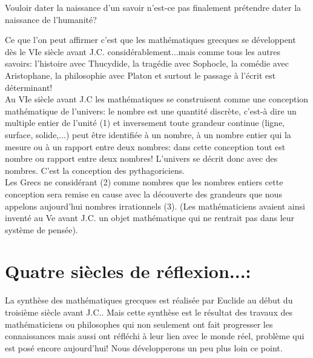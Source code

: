 \documentclass[a4paper, 12pt, twoside]{book}
\begin{document}
Vouloir dater la naissance d'un savoir n'est-ce pas finalement prétendre dater la naissance de l'humanité?\



     Ce que l'on peut affirmer c'est que les mathématiques grecques se développent dès le VIe siècle avant J.C. considérablement...mais comme tous les autres savoirs: l'histoire avec Thucydide, la tragédie avec Sophocle, la comédie avec Aristophane, la philosophie avec Platon et surtout le passage à l'écrit est déterminant!\\
     

      Au VIe siècle avant J.C les mathématiques se construisent comme une conception mathématique de l'univers: le nombre est une quantité discrète, c'est-à dire un multiple entier de l'unité (1) et inversement toute grandeur continue (ligne, surface, solide,...) peut être identifiée à un nombre, à un nombre entier qui la mesure ou à un rapport entre deux nombres: dans cette conception tout est nombre ou rapport entre deux nombres!  L'univers se décrit donc avec des nombres. C'est la conception des pythagoriciens.\\
      
       Les Grecs ne considérant (2) comme nombres que les nombres entiers cette conception sera remise en cause avec la découverte des grandeurs que nous appelons aujourd'hui nombres irrationnels (3). (Les mathématiciens avaient ainsi inventé au Ve avant J.C. un objet mathématique qui ne rentrait pas dans leur système de pensée).\
       
        \section{Quatre siècles de réflexion...:}
     
      
     
      La synthèse des mathématiques grecques est réalisée par Euclide au début du troisième siècle avant J.C.. Mais cette synthèse est le résultat des travaux des mathématiciens ou philosophes qui non seulement ont fait progresser les connaissances mais aussi ont réfléchi à leur lien avec le monde réel, problème qui est posé encore aujourd'hui! Nous développerons un peu plus loin ce point.\bigskip 
      
\end{document}
